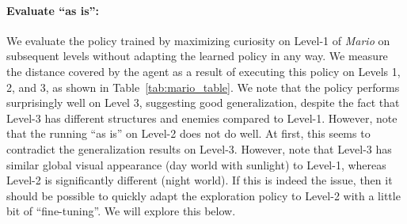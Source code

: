 \documentclass{article}
\begin{document}
\begin{table}[t]
\centering
{}
\vspace{-0.15in}
\caption{Quantitative evaluation of the agent trained to play Super Mario Bros. using only curiosity signal without any rewards from the game. Our agent was trained with no rewards in Level-1. We then evaluate the agent's policy both when it is run ``as is'', and further fine-tuned on subsequent levels. The results are compared to settings when Mario agent is train from scratch in Level-2,3 using only curiosity without any extrinsic rewards. Evaluation metric is based on the distance covered by the Mario agent.}
\label{tab:mario_table}
\end{table}

\paragraph{Evaluate ``as is'':}
We evaluate the policy trained by maximizing curiosity on Level-1 of {\em Mario} on subsequent levels without adapting the learned policy in any way. We measure the distance covered by the agent as a result of executing this policy on Levels 1, 2, and 3, as shown in Table~\ref{tab:mario_table}. We note that the policy performs surprisingly well on Level 3, suggesting good generalization, despite the fact that Level-3 has different structures and enemies compared to Level-1. However, note that the running ``as is'' on Level-2 does not do well.
At first, this seems to contradict the generalization results on Level-3. However, note that Level-3 has similar global visual appearance (day world with sunlight) to Level-1, whereas Level-2 is significantly different (night world). If this is indeed the issue, then it should be possible to quickly adapt the exploration policy to Level-2 with a little bit of ``fine-tuning''. We will explore this below.
\end{document}
